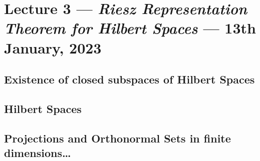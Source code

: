 \section{Lecture 3 --- \textit{Riesz Representation Theorem for Hilbert Spaces} --- 13th January, 2023}

\subsection{Existence of closed subspaces of Hilbert Spaces}

\subsection{Hilbert Spaces}

\subsection{Projections and Orthonormal Sets in finite dimensions\ldots}
